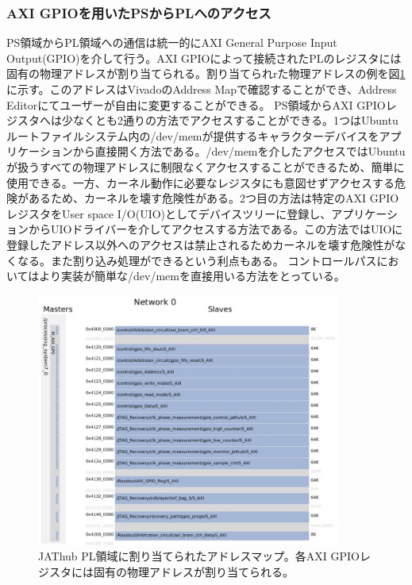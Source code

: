 \subsubsection{AXI GPIOを用いたPSからPLへのアクセス}
\label{subsubsec_axi}
\baselineskip
PS領域からPL領域への通信は統一的にAXI General Purpose Input Output(GPIO)を介して行う。AXI GPIOによって接続されたPLのレジスタには固有の物理アドレスが割り当てられる。割り当てられrた物理アドレスの例を図\ref{JATHuaddress}に示す。このアドレスはVivadoのAddress Mapで確認することができ、Address Editorにてユーザーが自由に変更することができる。
PS領域からAXI GPIOレジスタへは少なくとも2通りの方法でアクセスすることができる。1つはUbuntuルートファイルシステム内の/dev/memが提供するキャラクターデバイスをアプリケーションから直接開く方法である。/dev/memを介したアクセスではUbuntuが扱うすべての物理アドレスに制限なくアクセスすることができるため、簡単に使用できる。一方、カーネル動作に必要なレジスタにも意図せずアクセスする危険があるため、カーネルを壊す危険性がある。2つ目の方法は特定のAXI GPIOレジスタをUser space I/O(UIO)としてデバイスツリーに登録し、アプリケーションからUIOドライバーを介してアクセスする方法である。この方法ではUIOに登録したアドレス以外へのアクセスは禁止されるためカーネルを壊す危険性がなくなる。また割り込み処理ができるという利点もある。
コントロールパスにおいてはより実装が簡単な/dev/memを直接用いる方法をとっている。
\baselineskip

\begin{figure} 
\centering
\includegraphics[width=10cm]{fig/QAQC/JATHubaddress.png}
\caption[アドレスマップ]{JAThub PL領域に割り当てられたアドレスマップ。各AXI GPIOレジスタには固有の物理アドレスが割り当てられる。}
\label{JATHuaddress}
\end{figure}


